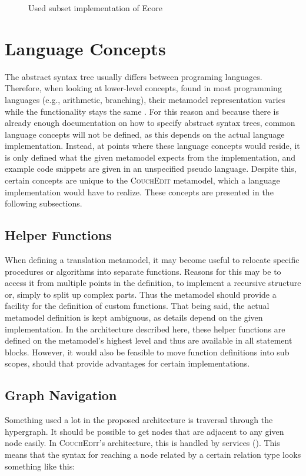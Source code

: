 \begin{figure}
  \centering
  
  \caption{Used subset implementation of Ecore}
  \label{fig:csd-abstractsyntax}
\end{figure}


\section{Language Concepts}
\label{sec:language-concepts}
The abstract syntax tree usually differs between programing languages. Therefore, when looking at lower-level concepts, found in most programming languages (e.g., arithmetic, branching), their metamodel representation varies while the functionality stays the same . For this reason and because there is already enough documentation on how to specify abstract syntax trees, common language concepts will not be defined, as this depends on the actual language implementation. Instead, at points where these language concepts would reside, it is only defined what the given metamodel expects from the implementation, and example code snippets are given in an unspecified pseudo language. Despite this, certain concepts are unique to the \textsc{CouchEdit} metamodel, which a language implementation would have to realize. These concepts are presented in the following subsections.


\subsection{Helper Functions}
When defining a translation metamodel, it may become useful to relocate specific procedures or algorithms into separate functions. Reasons for this may be to access it from multiple points in the definition, to implement a recursive structure or, simply to split up complex parts. Thus the metamodel should provide a facility for the definition of custom functions. That being said, the actual metamodel definition is kept ambiguous, as details depend on the given implementation. In the architecture described here, these helper functions are defined on the metamodel's highest level and thus are available in all statement blocks. However, it would also be feasible to move function definitions into sub scopes, should that provide advantages for certain implementations.

\subsection{Graph Navigation}
\label{sec:abstraction}
Something used a lot in the proposed architecture is traversal through the hypergraph. It should be possible to get nodes that are adjacent to any given node easily. In \textsc{CouchEdit}'s architecture, this is handled by services (). This means that the syntax for reaching a node related by a certain relation type looks something like this:


